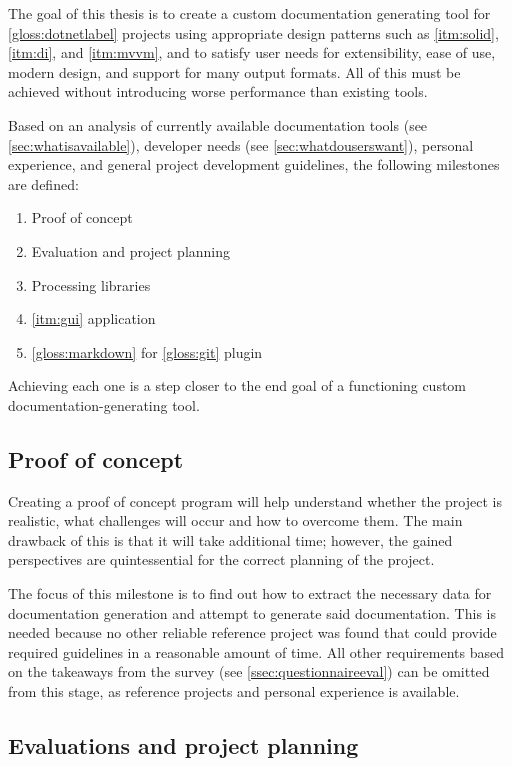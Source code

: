 The goal of this thesis is to create a custom documentation generating tool for \ref{gloss:dotnetlabel} projects using appropriate design patterns such as \ref{itm:solid}, \ref{itm:di}, and \ref{itm:mvvm}, and to satisfy user needs for extensibility, ease of use, modern design, and support for many output formats. All of this must be achieved without introducing worse performance than existing tools.

Based on an analysis of currently available documentation tools (see \ref{sec:whatisavailable}), developer needs (see \ref{sec:whatdouserswant}), personal experience, and general project development guidelines, the following milestones are defined:
\begin{enumerate}
    \item Proof of concept
    \item Evaluation and project planning
    \item Processing libraries
    \item \ref{itm:gui} application
    \item \ref{gloss:markdown} for \ref{gloss:git} plugin
\end{enumerate}

Achieving each one is a step closer to the end goal of a functioning custom documentation-generating tool.

\subsection*{Proof of concept} \label{subSecProofOfConcept}

Creating a proof of concept program will help understand whether the project is realistic, what challenges will occur and how to overcome them.
The main drawback of this is that it will take additional time; however, the gained perspectives are quintessential for the correct planning of the project.

The focus of this milestone is to find out how to extract the necessary data for documentation generation and attempt to generate said documentation.
This is needed because no other reliable reference project was found that could provide required guidelines in a reasonable amount of time.
All other requirements based on the takeaways from the survey (see \ref{ssec:questionnaireeval}) can be omitted from this stage, as reference projects and personal experience is available.

\subsection*{Evaluations and project planning} \label{subSecEvalProjPlanning}

